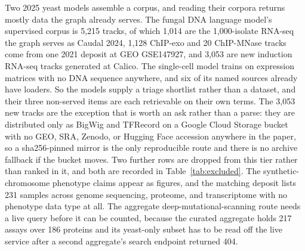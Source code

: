 Two 2025 yeast models assemble a corpus, and reading their corpora returns mostly data the
graph already serves. The fungal DNA language model's supervised corpus is 5,215 tracks, of
which 1,014 are the 1,000-isolate RNA-seq the graph serves as Caudal 2024, 1,128 ChIP-exo and
20 ChIP-MNase tracks come from one 2021 deposit at GEO GSE147927, and 3,053 are new induction
RNA-seq tracks generated at Calico. The single-cell model trains on expression matrices with no
DNA sequence anywhere, and six of its named sources already have loaders. So the models supply
a triage shortlist rather than a dataset, and their three non-served items are each retrievable
on their own terms. The 3,053 new tracks are the exception that is worth an ask rather than a
parse: they are distributed only as BigWig and TFRecord on a Google Cloud Storage bucket with
no GEO, SRA, Zenodo, or Hugging Face accession anywhere in the paper, so a sha256-pinned mirror
is the only reproducible route and there is no archive fallback if the bucket moves. Two
further rows are dropped from this tier rather than ranked in it, and both are recorded in
Table~\ref{tab:excluded}. The synthetic-chromosome phenotype claims appear as figures, and the
matching deposit lists 231 samples across genome sequencing, proteome, and transcriptome with
no phenotype data type at all. The aggregate deep-mutational-scanning route needs a live query
before it can be counted, because the curated aggregate holds 217 assays over 186 proteins and
its yeast-only subset has to be read off the live service after a second aggregate's search
endpoint returned 404.
